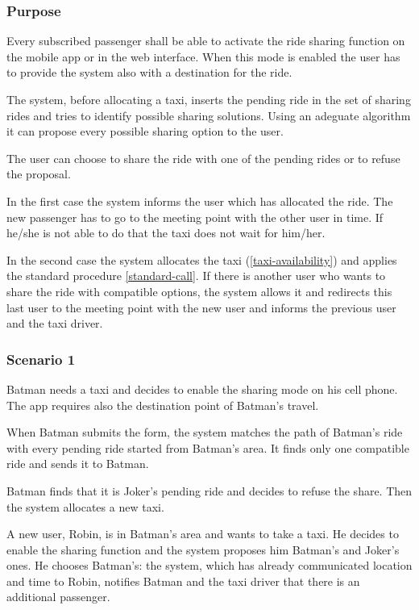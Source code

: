 \label{ride-sharing}
\subsubsection{Purpose}

Every subscribed passenger shall be able to activate the ride sharing function on the mobile app or in the web interface. When this mode is enabled the user has to provide the system also with a destination for the ride.

The system, before allocating a taxi, inserts the pending ride in the set of sharing rides and tries to identify possible sharing solutions. Using an adeguate algorithm it can propose every possible sharing option to the user. 

The user can choose to share the ride with one of the pending rides or to refuse the proposal.

In the first case the system informs the user which has allocated the ride. The new passenger has to go to the meeting point with the other user in time. If he/she is not able to do that the taxi does not wait for him/her.

In the second case the system allocates the taxi (\ref{taxi-availability}) and applies the standard procedure \ref{standard-call}. If there is another user who wants to share the ride with compatible options, the system allows it and redirects this last user to the meeting point with the new user and informs the previous user and the taxi driver.

\subsubsection{Scenario 1}
Batman needs a taxi and decides to enable the sharing mode on his cell phone. The app requires also the destination point of Batman's travel.
 
 When Batman submits the form, the system matches the path of Batman's ride with every pending ride started from Batman's area. It finds only one compatible ride and sends it to Batman.
 
 Batman finds that it is Joker's pending ride and decides to refuse the share. Then the system allocates a new taxi.
 
 A new user, Robin, is in Batman's area and wants to take a taxi. He decides to enable the sharing function and the system proposes him Batman's and Joker's ones. He chooses Batman's: the system, which has already communicated location and time to Robin, notifies Batman and the taxi driver that there is an additional passenger.
 
